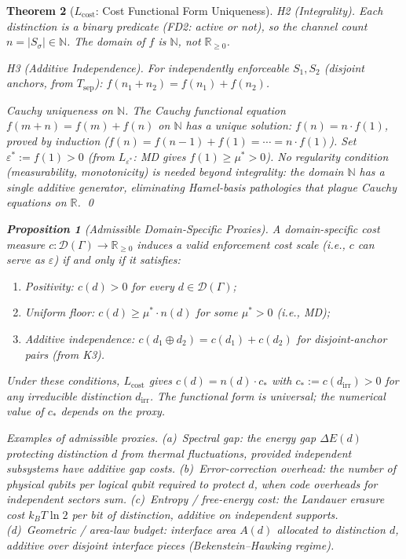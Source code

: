 \documentclass[11pt,a4paper]{article}
\newtheorem{theorem}{Theorem}[section]
\newtheorem{proposition}[theorem]{Proposition}
\theoremstyle{definition}
\newcommand{\eps}{\varepsilon}
\begin{document}
\begin{theorem}[$L_{\mathrm{cost}}$: Cost Functional Form Uniqueness]
\textit{H2 (Integrality).}  Each distinction is a binary predicate (FD2: active or not), so the channel count $n = |S_\sigma| \in \mathbb{N}$.  The domain of $f$ is $\mathbb{N}$, not $\mathbb{R}_{\ge 0}$.

\textit{H3 (Additive Independence).}  For independently enforceable $S_1, S_2$ (disjoint anchors, from $T_{\mathrm{sep}}$): $f(n_1 + n_2) = f(n_1) + f(n_2)$.

\textit{Cauchy uniqueness on $\mathbb{N}$.}  The Cauchy functional equation $f(m+n) = f(m) + f(n)$ on $\mathbb{N}$ has a unique solution: $f(n) = n \cdot f(1)$, proved by induction ($f(n) = f(n-1) + f(1) = \cdots = n \cdot f(1)$).  Set $\eps^* := f(1) > 0$ (from $L_{\eps^*}$: MD gives $f(1) \ge \mu^* > 0$).  No regularity condition (measurability, monotonicity) is needed beyond integrality: the domain $\mathbb{N}$ has a single additive generator, eliminating Hamel-basis pathologies that plague Cauchy equations on $\mathbb{R}$.  \qed

\begin{proposition}[Admissible Domain-Specific Proxies]\label{prop:proxies}
A domain-specific cost measure $c: \mathcal{D}(\Gamma) \to \mathbb{R}_{\ge 0}$ induces a valid enforcement cost scale (i.e., $c$ can serve as $\eps$) if and only if it satisfies:
\begin{enumerate}[nosep,label=(\roman*),leftmargin=2.5em]
\item \textit{Positivity:} $c(d) > 0$ for every $d \in \mathcal{D}(\Gamma)$;
\item \textit{Uniform floor:} $c(d) \ge \mu^* \cdot n(d)$ for some $\mu^* > 0$ (i.e., MD);
\item \textit{Additive independence:} $c(d_1 \oplus d_2) = c(d_1) + c(d_2)$ for disjoint-anchor pairs (from K3).
\end{enumerate}
Under these conditions, $L_{\mathrm{cost}}$ gives $c(d) = n(d) \cdot c_*$ with $c_* := c(d_{\mathrm{irr}}) > 0$ for any irreducible distinction $d_{\mathrm{irr}}$.  The functional form is universal; the numerical value of $c_*$ depends on the proxy.

\smallskip\noindent\textit{Examples of admissible proxies.}
(a)~\textit{Spectral gap:} the energy gap $\Delta E(d)$ protecting distinction $d$ from thermal fluctuations, provided independent subsystems have additive gap costs.
(b)~\textit{Error-correction overhead:} the number of physical qubits per logical qubit required to protect $d$, when code overheads for independent sectors sum.
(c)~\textit{Entropy / free-energy cost:} the Landauer erasure cost $k_B T \ln 2$ per bit of distinction, additive on independent supports.
(d)~\textit{Geometric / area-law budget:} interface area $A(d)$ allocated to distinction $d$, additive over disjoint interface pieces (Bekenstein--Hawking regime).


\end{proposition}
\end{theorem}
\end{document}
